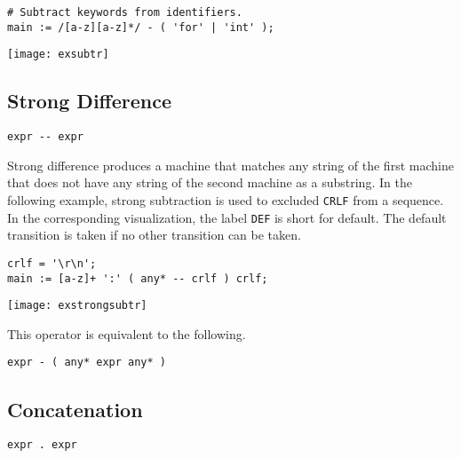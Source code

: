 \documentclass[letterpaper,11pt,oneside]{book}
\newcommand{\verbspace}{\vspace{10pt}}
\newcommand{\graphspace}{\vspace{10pt}}
\newenvironment{inline_code}{\def\baselinestretch{1}\vspace{12pt}\small}{}
\begin{document}
\verbspace

% GENERATE: exsubtr
\begin{inline_code}
\begin{verbatim}
# Subtract keywords from identifiers.
main := /[a-z][a-z]*/ - ( 'for' | 'int' );
\end{verbatim}
\end{inline_code}

\graphspace
\begin{center}
\texttt{[image: exsubtr]}
\end{center}
\graphspace


\subsection{Strong Difference}
\label{strong_difference}

\verb|expr -- expr|
\verbspace

Strong difference produces a machine that matches any string of the first
machine that does not have any string of the second machine as a substring. In
the following example, strong subtraction is used to excluded \verb|CRLF| from
a sequence. In the corresponding visualization, the label \verb|DEF| is short
for default. The default transition is taken if no other transition can be
taken.

\begin{inline_code}
\begin{verbatim}
crlf = '\r\n';
main := [a-z]+ ':' ( any* -- crlf ) crlf;
\end{verbatim}
\end{inline_code}

\graphspace
\begin{center}
\texttt{[image: exstrongsubtr]}
\end{center}
\graphspace

This operator is equivalent to the following.

\verbspace
\begin{verbatim}
expr - ( any* expr any* )
\end{verbatim}

\subsection{Concatenation}

\verb|expr . expr|
\verbspace
\end{document}
